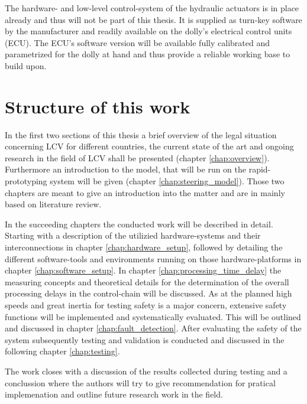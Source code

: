 \documentclass[ExampleMasters.tex]{subfiles}
\begin{document}
The hardware- and low-level control-system of the hydraulic actuators is in place already and thus will not be part of this thesis. It is supplied as turn-key software by the manufacturer and readily available on the dolly's electrical control units (ECU). The ECU's software version will be available fully calibrated and parametrized for the dolly at hand and thus provide a reliable working base to build upon. 


\section{Structure of this work}
\label{sec:structure}

In the first two sections of this thesis a brief overview of the legal situation concerning LCV for different countries, the current state of the art and ongoing research in the field of LCV shall be presented (chapter \ref{chap:overview}). Furthermore an introduction to the model, that will be run on the rapid-prototyping system will be given (chapter \ref{chap:steering_model}). Those two chapters are meant to give an introduction into the matter and are in mainly based on literature review. 

In the succeeding chapters the conducted work will be described in detail. Starting with a description of the utilizied hardware-systems and their interconnections in chapter \ref{chap:hardware_setup}, followed by detailing the different software-tools and environments running on those hardware-platforms in chapter \ref{chap:software_setup}. In chapter \ref{chap:processing_time_delay} the measuring concepts and theoretical details for the determination of the overall processing delays in the control-chain will be discussed. As at the planned high speeds and great inertia for testing safety is a major concern, extensive safety functions will be implemented and systematically evaluated. This will be outlined and discussed in chapter \ref{chap:fault_detection}. After evaluating the safety of the system subsequently testing and validation is conducted and discussed in the following chapter  \ref{chap:testing}. 

The work closes with a discussion of the results collected during testing and a conclussion where the authors will try to give recommendation for pratical implemenation and outline future research work in the field.
\end{document}
